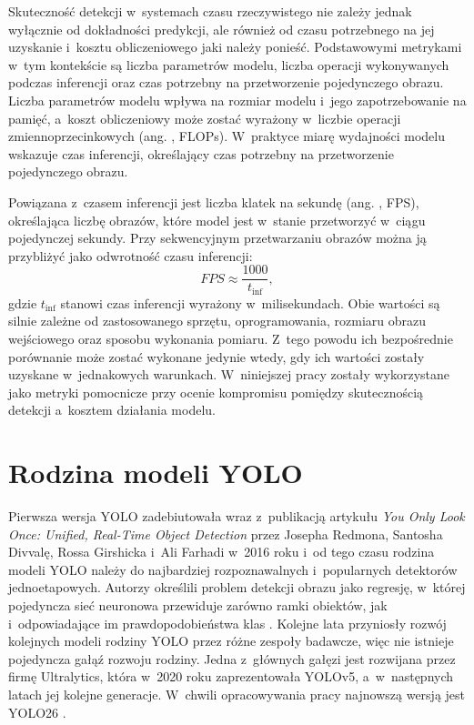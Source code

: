 Skuteczność detekcji w~systemach czasu rzeczywistego nie zależy jednak wyłącznie od dokładności predykcji, ale również od czasu potrzebnego na jej uzyskanie i~kosztu obliczeniowego jaki należy ponieść. Podstawowymi metrykami w~tym kontekście są liczba parametrów modelu, liczba operacji wykonywanych podczas inferencji oraz czas potrzebny na przetworzenie pojedynczego obrazu. Liczba parametrów modelu wpływa na rozmiar modelu i~jego zapotrzebowanie na pamięć, a~koszt obliczeniowy może zostać wyrażony w~liczbie operacji zmiennoprzecinkowych (ang. , FLOPs). W~praktyce miarę wydajności modelu wskazuje czas inferencji, określający czas potrzebny na przetworzenie pojedynczego obrazu.

Powiązana z~czasem inferencji jest liczba klatek na sekundę (ang. , FPS), określająca liczbę obrazów, które model jest w~stanie przetworzyć w~ciągu pojedynczej sekundy. Przy sekwencyjnym przetwarzaniu obrazów można ją przybliżyć jako odwrotność czasu inferencji:
\begin{equation}
    FPS \approx \frac{1000}{t_{\mathrm{inf}}},
\end{equation}
gdzie $t_{\mathrm{inf}}$ stanowi czas inferencji wyrażony w~milisekundach. Obie wartości są silnie zależne od zastosowanego sprzętu, oprogramowania, rozmiaru obrazu wejściowego oraz sposobu wykonania pomiaru. Z~tego powodu ich bezpośrednie porównanie może zostać wykonane jedynie wtedy, gdy ich wartości zostały uzyskane w~jednakowych warunkach. W~niniejszej pracy zostały wykorzystane jako metryki pomocnicze przy ocenie kompromisu pomiędzy skutecznością detekcji a~kosztem działania modelu.

\section{Rodzina modeli YOLO}
\label{s:yolo}

Pierwsza wersja YOLO zadebiutowała wraz z~publikacją artykułu \textit{You Only Look Once: Unified, Real-Time Object Detection} przez Josepha Redmona, Santosha Divvalę, Rossa Girshicka i~Ali Farhadi w~2016 roku i~od tego czasu rodzina modeli YOLO należy do najbardziej rozpoznawalnych i~popularnych detektorów jednoetapowych. Autorzy określili problem detekcji obrazu jako regresję, w~której pojedyncza sieć neuronowa przewiduje zarówno ramki obiektów, jak i~odpowiadające im prawdopodobieństwa klas \cite{bib:redmon2016lookonceunifiedrealtime}. Kolejne lata przyniosły rozwój kolejnych modeli rodziny YOLO przez różne zespoły badawcze, więc nie istnieje pojedyncza gałąź rozwoju rodziny. Jedna z~głównych gałęzi jest rozwijana przez firmę Ultralytics, która w~2020 roku zaprezentowała YOLOv5, a~w~następnych latach jej kolejne generacje. W~chwili opracowywania pracy najnowszą wersją jest YOLO26 \cite{bib:jocher2026ultralyticsyolo26}.

